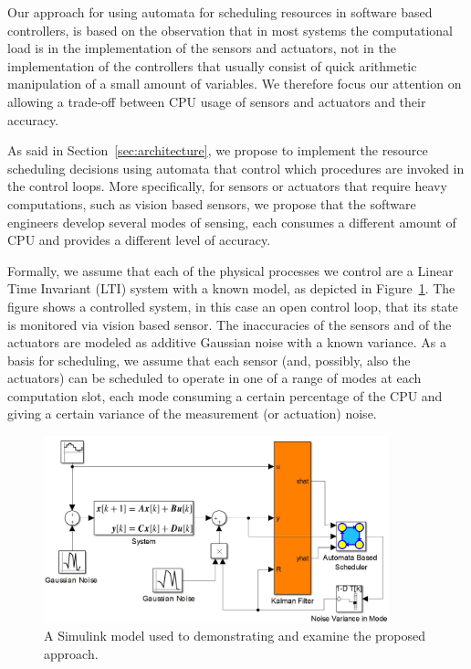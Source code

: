 \documentclass[ twoside, 12pt ]{article}
\begin{document}
Our approach for using automata for scheduling resources in software based controllers, is based on the observation that in most systems the computational load is in the implementation of the sensors and actuators, not in the implementation of the controllers that usually consist of quick arithmetic manipulation of a small amount of variables. We therefore focus our attention on allowing a trade-off between CPU usage of sensors and actuators and their accuracy. %

As said in Section~\ref{sec:architecture}, we propose to implement the resource scheduling decisions using automata that control which procedures are invoked in the control loops. More specifically, for sensors or actuators that require heavy computations, such as vision based sensors, we propose that the software engineers develop several modes of sensing, each consumes a different amount of CPU and provides a different level of accuracy. 

Formally, we assume that each of the physical processes we control are a Linear Time Invariant (LTI) system with a known model, as depicted in Figure~\ref{fig:simulink}. 
The figure shows a controlled system, in this case an open control loop, that its state is monitored via vision based sensor. 
The inaccuracies of the sensors and of the actuators are modeled as additive Gaussian noise with a known variance. As a basis for scheduling, we assume that each sensor (and, possibly, also the actuators) can be scheduled to operate in one of a range of modes at each computation slot, each mode consuming a certain percentage of the CPU and giving a certain variance of the measurement (or actuation) noise.

\begin{figure}%
    \centerline{\includegraphics[width=100mm]{SimulinkModel.jpg}}
    \caption{A Simulink model used to demonstrating and  examine the proposed approach.}
    \label{fig:simulink}
\end{figure}
\end{document}
